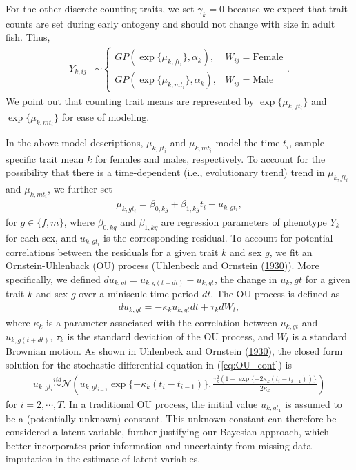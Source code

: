 \documentclass[
  12pt,
]{article}
\begin{document}
For the other discrete counting traits, we set \(\gamma_k = 0\) because
we expect that trait counts are set during early ontogeny and should not
change with size in adult fish. Thus, \begin{align}
{Y}_{k,ij} & \sim \left\{\begin{array}{ll} GP(\exp\{\mu_{k,ft_i}\},\alpha_k), & W_{ij} = \text{Female} \\ GP(\exp\{\mu_{k,mt_i}\},\alpha_k), & W_{ij} = \text{Male} \end{array}\right..
\label{eq:disc_ind}
\end{align} We point out that counting trait means are represented by
\(\exp\{\mu_{k,ft_i}\}\) and \(\exp\{\mu_{k,mt_i}\}\) for ease of
modeling.

In the above model descriptions, \(\mu_{k,ft_i}\) and \(\mu_{k,mt_i}\)
model the time-\(t_i\), sample-specific trait mean \(k\) for females and
males, respectively. To account for the possibility that there is a
time-dependent (i.e., evolutionary trend) trend in \(\mu_{k,ft_i}\) and
\(\mu_{k,mt_i}\), we further set \begin{align}
\mu_{k,gt_i} = \beta_{0,kg} + \beta_{1,kg}t_i + u_{k,gt_i},
\label{eq:mu}
\end{align} for \(g \in \{f,m\}\), where \(\beta_{0,kg}\) and
\(\beta_{1,kg}\) are regression parameters of phenotype \(Y_k\) for each
sex, and \(u_{k,gt_i}\) is the corresponding residual. To account for
potential correlations between the residuals for a given trait \(k\) and
sex \(g\), we fit an Ornstein-Uhlenback (OU) process (Uhlenbeck and
Ornstein (\protect\hyperlink{ref-OUProcess}{1930})). More specifically,
we defined \(du_{k,gt} = u_{k,g(t + dt)} - u_{k,gt}\), the change in
\(u_k,gt\) for a given trait \(k\) and sex \(g\) over a miniscule time
period \(dt\). The OU process is defined as \begin{align}
du_{k,gt} = -\kappa_k u_{k,gt} dt + \tau_k dW_t,
\label{eq:OU_cont}
\end{align} where \(\kappa_k\) is a parameter associated with the
correlation between \(u_{k,gt}\) and \(u_{k,g(t+dt)}\), \(\tau_k\) is
the standard deviation of the OU process, and \(W_t\) is a standard
Brownian motion. As shown in Uhlenbeck and Ornstein
(\protect\hyperlink{ref-OUProcess}{1930}), the closed form solution for
the stochastic differential equation in (\ref{eq:OU_cont}) is
\begin{align}
u_{k,gt_i} \overset{iid}{\sim}\mathcal{N}\left(u_{k,gt_{i-1}}\exp\{-\kappa_k(t_{i} - t_{i-1})\} , \frac{\tau_k^2(1 - \exp\{-2\kappa_k(t_{i} - t_{i-1}))\}}{2\kappa_k}\right)
\label{eq:OU_sol}
\end{align} for \(i = 2,\cdots,T\). In a traditional OU process, the
initial value \(u_{k,gt_1}\) is assumed to be a (potentially unknown)
constant. This unknown constant can therefore be considered a latent
variable, further justifying our Bayesian approach, which better
incorporates prior information and uncertainty from missing data
imputation in the estimate of latent variables.
\end{document}
